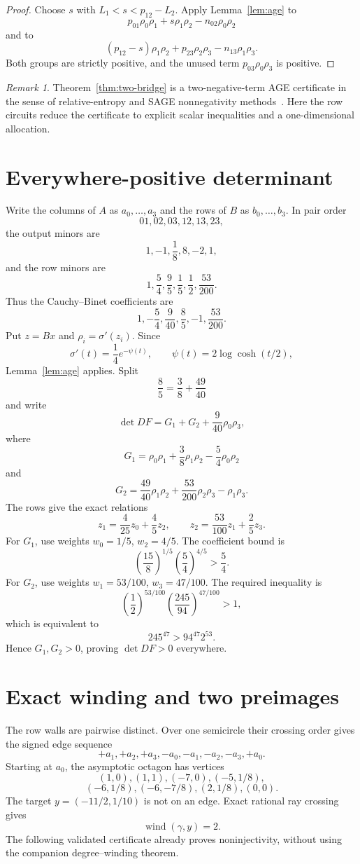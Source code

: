 \documentclass[11pt]{article}
\theoremstyle{remark}
\newtheorem{remark}[theorem]{Remark}
\newcommand{\wind}{\operatorname{wind}}
\begin{document}
\begin{proof}
Choose $s$ with $L_1<s<p_{12}-L_2$. Apply Lemma~\ref{lem:age} to
\[
 p_{01}\rho_0\rho_1+s\rho_1\rho_2-n_{02}\rho_0\rho_2
\]
and to
\[
 (p_{12}-s)\rho_1\rho_2+p_{23}\rho_2\rho_3-n_{13}\rho_1\rho_3.
\]
Both groups are strictly positive, and the unused term $p_{03}\rho_0\rho_3$ is positive.
\end{proof}

\begin{remark}
Theorem~\ref{thm:two-bridge} is a two-negative-term AGE certificate in the sense of relative-entropy and SAGE nonnegativity methods~\cite{ChandrasekaranShah,MurrayEtAl}. Here the row circuits reduce the certificate to explicit scalar inequalities and a one-dimensional allocation.
\end{remark}

\section{Everywhere-positive determinant}\label{sec:det}
Write the columns of $A$ as $a_0,\ldots,a_3$ and the rows of $B$ as $b_0,\ldots,b_3$. In pair order
\[
01,02,03,12,13,23,
\]
the output minors are
\[
 1,-1,\frac18,8,-2,1,
\]
and the row minors are
\[
 1,\frac54,\frac95,\frac15,\frac12,\frac{53}{200}.
\]
Thus the Cauchy--Binet coefficients are
\[
 1,-\frac54,\frac9{40},\frac85,-1,\frac{53}{200}.
\]
Put $z=Bx$ and $\rho_i=\sigma'(z_i)$. Since
\[
 \sigma'(t)=\frac14e^{-\psi(t)},
 \qquad \psi(t)=2\log\cosh(t/2),
\]
Lemma~\ref{lem:age} applies. Split
\[
 \frac85=\frac38+\frac{49}{40}
\]
and write
\[
 \det DF=G_1+G_2+\frac9{40}\rho_0\rho_3,
\]
where
\[
 G_1=\rho_0\rho_1+\frac38\rho_1\rho_2-\frac54\rho_0\rho_2
\]
and
\[
 G_2=\frac{49}{40}\rho_1\rho_2
 +\frac{53}{200}\rho_2\rho_3-\rho_1\rho_3.
\]
The rows give the exact relations
\[
 z_1=\frac4{25}z_0+\frac45z_2,
 \qquad
 z_2=\frac{53}{100}z_1+\frac25z_3.
\]
For $G_1$, use weights $w_0=1/5$, $w_2=4/5$. The coefficient bound is
\[
 \left(\frac{15}{8}\right)^{1/5}
 \left(\frac54\right)^{4/5}>\frac54.
\]
For $G_2$, use weights $w_1=53/100$, $w_3=47/100$. The required inequality is
\[
 \left(\frac12\right)^{53/100}
 \left(\frac{245}{94}\right)^{47/100}>1,
\]
which is equivalent to
\[
 245^{47}>94^{47}2^{53}.
\]
Hence $G_1,G_2>0$, proving $\det DF>0$ everywhere.

\section{Exact winding and two preimages}\label{sec:winding}
The row walls are pairwise distinct. Over one semicircle their crossing order gives the signed edge sequence
\[
 +a_1,+a_2,+a_3,-a_0,-a_1,-a_2,-a_3,+a_0.
\]
Starting at $a_0$, the asymptotic octagon has vertices
\[
 (1,0),(1,1),(-7,0),(-5,1/8),
\]
\[
 (-6,1/8),(-6,-7/8),(2,1/8),(0,0).
\]
The target $y=(-11/2,1/10)$ is not on an edge. Exact rational ray crossing gives
\[
 \wind(\gamma,y)=2.
\]
The following validated certificate already proves noninjectivity, without using the companion degree--winding theorem.
\end{document}
